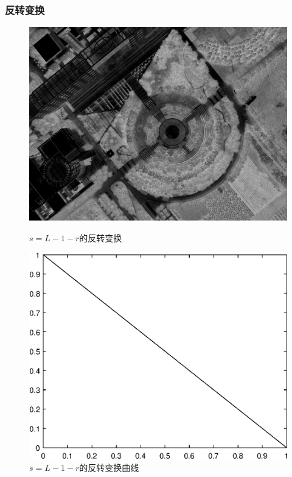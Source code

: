 \subsubsection{反转变换}
\begin{figure}[H]
	\centering
	\begin{minipage}{0.45\linewidth}
		\includegraphics[width=\linewidth]{figure/DJI_0027_Reversed.png}
		\caption{$s=L-1-r$的反转变换}
	\end{minipage}
	\begin{minipage}{0.45\linewidth}
		\includegraphics[width=\linewidth]{figure/DJI_0027_Reversed_Graph.eps}
		\caption{$s=L-1-r$的反转变换曲线}
	\end{minipage}
\end{figure}
